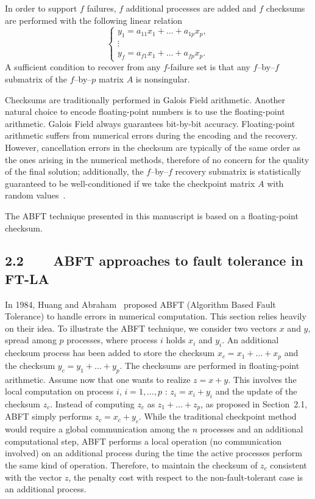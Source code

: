 \documentclass[pdftex,11pt]{article}
\begin{document}
In order to support $f$ failures, $f$ additional processes are added
and $f$ checksums are performed with the following linear relation
$$
\left\{\begin{array}{l}
 y_1 = a_{11}x_1 + \ldots + a_{1p} x_p,\\
\vdots \\
 y_f = a_{f1}x_1 + \ldots + a_{fp} x_p.
\end{array}\right. 
$$
A sufficient condition to recover from any $f$-failure set is that any
$f$--by--$f$ submatrix of the $f$--by--$p$ matrix $A$ is nonsingular.


Checksums are traditionally performed in Galois Field
arithmetic. Another natural choice to encode floating-point numbers is
to use the floating-point arithmetic. Galois Field always guarantees
bit-by-bit accuracy. Floating-point arithmetic suffers from numerical
errors during the encoding and the recovery. However, cancellation
errors in the checksum are typically of the same order as the ones
arising in the numerical methods, therefore of no concern for the
quality of the final solution; additionally, the $f$--by--$f$ recovery
submatrix is statistically guaranteed to be well-conditioned if we
take the checkpoint matrix $A$ with random values~\cite{ChDo:05}.

The ABFT technique presented in this manuscript is based on a
floating-point checksum.

\subsection*{\color{DodgerBlue4}2.2~~~~ABFT approaches to fault
  tolerance in FT-LA}

In 1984, Huang and Abraham~\cite{HuAb:84} proposed ABFT (Algorithm
Based Fault Tolerance) to handle errors in numerical computation. This
section relies heavily on their idea. To illustrate the ABFT
technique, we consider two vectors $x$ and $y$, spread among $p$
processes, where process $i$ holds $x_i$ and $y_i$. An additional
checksum process has been added to store the checksum $x_c = x_1 +
\ldots + x_p $ and the checksum $y_c= y_1 + \ldots + y_p$. The
checksums are performed in floating-point arithmetic. Assume now that
one wants to realize $z = x + y$.  This involves the local computation
on process $i$, $i=1,\ldots,p$ : $z_i = x_i + y_i$ and the update of
the checksum $z_c$. Instead of computing $z_c$ as $z_1 + \ldots +
z_p$, as proposed in Section~\color{DodgerBlue4}2.1\color{black},
ABFT simply performs $z_c= x_c + y_c$. While the traditional
checkpoint method would require a global communication among the $n$
processes and an additional computational step, ABFT performs a local
operation (no communication involved) on an additional process during
the time the active processes perform the same kind of operation.
Therefore, to maintain the checksum of $z_c$ consistent with the
vector $z$, the penalty cost with respect to the non-fault-tolerant
case is an additional process.
\end{document}
